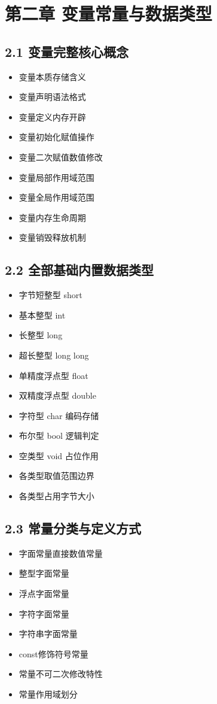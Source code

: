 \section{第二章 变量常量与数据类型}
\subsection{2.1 变量完整核心概念}
\begin{itemize}
\item 变量本质存储含义
\item 变量声明语法格式
\item 变量定义内存开辟
\item 变量初始化赋值操作
\item 变量二次赋值数值修改
\item 变量局部作用域范围
\item 变量全局作用域范围
\item 变量内存生命周期
\item 变量销毁释放机制
\end{itemize}

\subsection{2.2 全部基础内置数据类型}
\begin{itemize}
\item 字节短整型 short
\item 基本整型 int
\item 长整型 long
\item 超长整型 long long
\item 单精度浮点型 float
\item 双精度浮点型 double
\item 字符型 char 编码存储
\item 布尔型 bool 逻辑判定
\item 空类型 void 占位作用
\item 各类型取值范围边界
\item 各类型占用字节大小
\end{itemize}

\subsection{2.3 常量分类与定义方式}
\begin{itemize}
\item 字面常量直接数值常量
\item 整型字面常量
\item 浮点字面常量
\item 字符字面常量
\item 字符串字面常量
\item const修饰符号常量
\item 常量不可二次修改特性
\item 常量作用域划分
\end{itemize}

